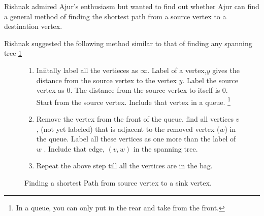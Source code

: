 Rishnak admired Ajur's enthusiasm but wanted to find out whether Ajur can find a general method of finding the shortest path from a source vertex to a destination vertex.

Rishnak suggested the following method similar to that of finding any spanning tree \ref{12a1}

\begin{figure} 
\begin{enumerate}
\item Iniitally label all the vertieces as $\infty$. Label of a vertex,$y$ gives the distance from the source vertex to the vertex $y$.  Label the source vertex as 0. The distance from the source vertex to itself is 0. Start from the source vertex. Include that vertex in a queue. \footnote{ In a queue, you can only put in the rear and take from the front.} 
\item Remove the vertex from the front of the queue. find all vertices $v$, (not yet labeled) that is adjacent to the removed vertex ($w$) in the queue. Label all these vertices as one more than the label of $w$ . Include that edge, $(v,w)$ in the spanning tree.
\item Repeat the above step till all the vertices are in the bag.
\end{enumerate}
\caption{Finding a shortest Path from source vertex to a sink vertex.}\label{12a1}
\end{figure}